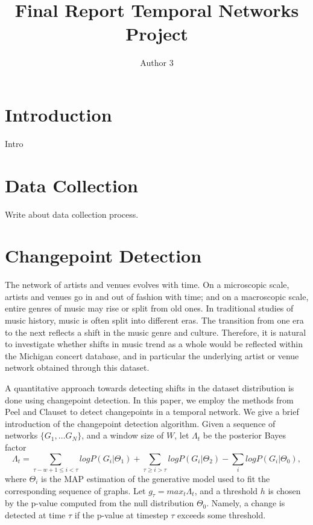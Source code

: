 \documentclass[9pt,twocolumn,twoside,lineno]{pnas-new}
\title{Final Report Temporal Networks Project}
\author{Author 3}
\begin{document}
\verticaladjustment{-2pt}

\maketitle
\thispagestyle{firststyle}

\section{Introduction}
Intro

\section{Data Collection}
Write about data collection process.

\section{Changepoint Detection}
The network of artists and venues evolves with time. On a microscopic scale, artists and venues go in and out of fashion with time; and on a macroscopic scale, entire genres of music may rise or split from old ones. In traditional studies of music history, music is often split into different  eras. The transition from one era to the next reflects a shift in the music genre and culture. Therefore, it is natural to investigate whether shifts in music trend as a whole would be reflected within the Michigan concert database, and in particular the underlying artist or venue network obtained through this dataset. 

A quantitative approach towards detecting shifts in the dataset distribution is done using changepoint detection. In this paper, we employ the methods from Peel and Clauset \cite{peel2014detecting} to detect changepoints in a temporal network. We give a brief introduction of the changepoint detection algorithm. Given a sequence of networks $\{G_1, \dots G_N\}$, and a window size of $W$, let $\Lambda_t$ be the posterior Bayes factor 
\begin{equation}
\Lambda_t = \sum_{\tau - w + 1 \leq  i < \tau}log P(G_i|\Theta_1) + \sum_{\tau \geq i > \tau}log P(G_i|\Theta_2) - \sum_i log P(G_i|\Theta_0), 
\end{equation}
where $\Theta_i$ is the MAP estimation of the generative model used to fit the corresponding sequence of graphs. Let $g_\tau = max_t \Lambda_t$, and a threshold $h$ is chosen by the p-value computed from the null distribution $\Theta_0$. Namely, a change is detected at time $\tau$ if the p-value at timestep $\tau$ exceeds some threshold. 
\end{document}
